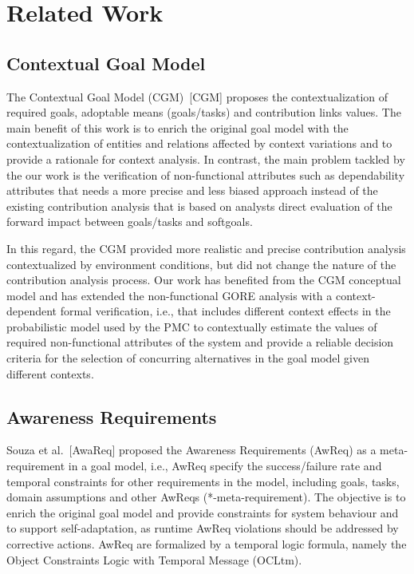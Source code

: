 \chapter{Related Work}\label{ch_related_work}

\section{Contextual Goal Model}

The Contextual Goal Model (CGM)~[CGM] proposes the contextualization of required goals, adoptable means (goals/tasks) and contribution links values. The main benefit of this work is to enrich the original goal model with the contextualization of entities and relations affected by context variations and to provide a rationale for context analysis. In contrast, the main problem tackled by the our work is the verification of non-functional attributes such as dependability attributes that needs a more precise and less biased approach instead of the existing contribution analysis that is based on analysts direct evaluation of the forward impact between goals/tasks and softgoals. 

In this regard, the CGM provided more realistic and precise contribution analysis contextualized by environment conditions, but did not change the nature of the contribution analysis process. Our work has benefited from the CGM conceptual model and has extended the non-functional GORE analysis with a context-dependent formal verification, i.e., that includes different context effects in the probabilistic model used by the PMC to contextually estimate the values of required non-functional attributes of the system and provide a reliable decision criteria for the selection of concurring alternatives in the goal model given different contexts.

\section{Awareness Requirements}

Souza et al.~[AwaReq] proposed the Awareness Requirements (AwReq) as a meta-requirement in a goal model, i.e., AwReq specify the success/failure rate and temporal constraints for other requirements in the model, including goals, tasks, domain assumptions and other AwReqs (*-meta-requirement). The objective is to enrich the original goal model and provide constraints for system behaviour and to support self-adaptation, as runtime AwReq violations should be addressed by corrective actions. AwReq are formalized by a temporal logic formula, namely the Object Constraints Logic with Temporal Message (OCLtm).

